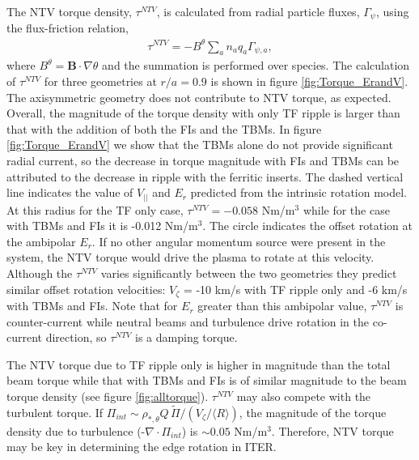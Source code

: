 \documentclass{article}
\begin{document}
The NTV torque density, $\tau^{NTV}$, is calculated from radial particle fluxes, $\Gamma_{\psi}$, using the flux-friction relation,
\begin{gather}
\tau^{NTV} = - B^{\theta} \sum_a n_a q_a \Gamma_{\psi, a},
\end{gather}
where $B^{\theta} = \bm{B} \cdot \nabla \theta$ and the summation is performed over species. The calculation of $\tau^{NTV}$ for three geometries at $r/a = 0.9$ is shown in figure \ref{fig:Torque_ErandV}. The axisymmetric geometry does not contribute to NTV torque, as expected. Overall, the magnitude of the torque density with only TF ripple is larger than that with the addition of both the FIs and the TBMs.  In figure \ref{fig:Torque_ErandV} we show that the TBMs alone do not provide significant radial current, so the decrease in torque magnitude with FIs and TBMs can be attributed to the decrease in ripple with the ferritic inserts. The dashed vertical line indicates the value of $V_{||}$ and $E_r$ predicted from the intrinsic rotation model. At this radius for the TF only case, $\tau^{NTV} = -0.058$ Nm/m$^3$ while for the case with TBMs and FIs it is -0.012 Nm/m$^3$. The circle indicates the offset rotation at the ambipolar $E_r$. If no other angular momentum source were present in the system, the NTV torque would drive the plasma to rotate at this velocity. Although the $\tau^{NTV}$ varies significantly between the two geometries they predict similar offset rotation velocities: $V_{\zeta}$ = -10 km/s with TF ripple only and -6 km/s with TBMs and FIs. Note that for $E_r$ greater than this ambipolar value, $\tau^{NTV}$ is counter-current while neutral beams and turbulence drive rotation in the co-current direction, so $\tau^{NTV}$ is a damping torque.

The NTV torque due to TF ripple only is higher in magnitude than the total beam torque while that with TBMs and FIs is of similar magnitude to the beam torque density (see figure \ref{fig:alltorque}). $\tau^{NTV}$ may also compete with the turbulent torque. If $\Pi_{int} \sim \rho_{*, \theta} Q\, \widetilde{\Pi}/(V_{\zeta}/\langle R \rangle)$, the magnitude of the torque density due to turbulence (-$\nabla \cdot \Pi_{int}$) is $\sim 0.05$ Nm/m$^3$. Therefore, NTV torque may be key in determining the edge rotation in ITER.

\FloatBarrier
\end{document}
